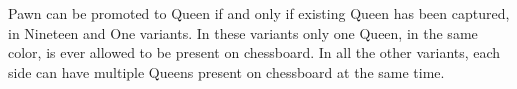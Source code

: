 Pawn can be promoted to Queen if and only if existing Queen has been captured, in
Nineteen and One variants. In these variants only one Queen, in the same color, is
ever allowed to be present on chessboard. In all the other variants, each side can
have multiple Queens present on chessboard at the same time.







\clearpage %
